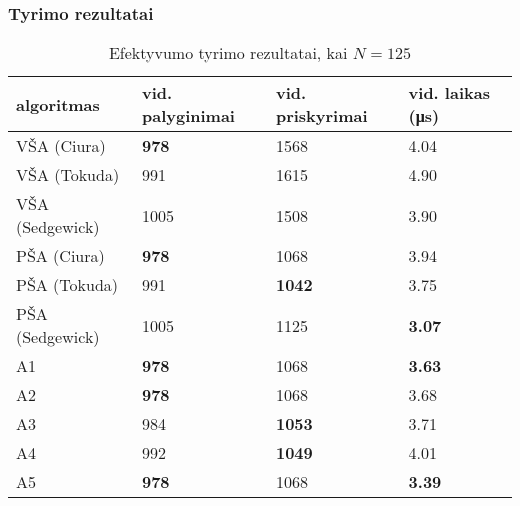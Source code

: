\documentclass{VUMIFInfKursinis}
\begin{document}
\subsubsection{Tyrimo rezultatai}

\begin{table}[H]
  \caption{Efektyvumo tyrimo rezultatai, kai $N = 125$}
  \label{results_125}
  \centering
  \begin{tabular}{@{}llll@{}}
  algoritmas & vid. palyginimai                     & vid. priskyrimai                      & vid. laikas (μs)                      \\ \midrule
  VŠA (Ciura)       & \cellcolor[HTML]{70AD47}\textbf{978} & 1568                                  & 4.04                                  \\
  VŠA (Tokuda)      & 991                                  & 1615                                  & 4.90                                  \\
  VŠA (Sedgewick)       & 1005                                 & 1508                                  & 3.90                                  \\
  PŠA (Ciura)      & \cellcolor[HTML]{70AD47}\textbf{978} & 1068                                  & 3.94                                  \\
  PŠA (Tokuda)      & 991                                  & \cellcolor[HTML]{70AD47}\textbf{1042} & 3.75                                  \\
  PŠA (Sedgewick)      & 1005                                 & 1125                                  & \cellcolor[HTML]{70AD47}\textbf{3.07} \\
  A1      & \cellcolor[HTML]{70AD47}\textbf{978} & 1068                                  & \cellcolor[HTML]{70AD47}\textbf{3.63} \\
  A2      & \cellcolor[HTML]{70AD47}\textbf{978} & 1068                                  & 3.68                                  \\
  A3      & 984                                  & \cellcolor[HTML]{70AD47}\textbf{1053} & 3.71                                  \\
  A4      & 992                                  & \cellcolor[HTML]{70AD47}\textbf{1049} & 4.01                                  \\
  A5      & \cellcolor[HTML]{70AD47}\textbf{978} & 1068                                  & \cellcolor[HTML]{70AD47}\textbf{3.39} \\ \bottomrule
  \end{tabular}
\end{table}
\end{document}
